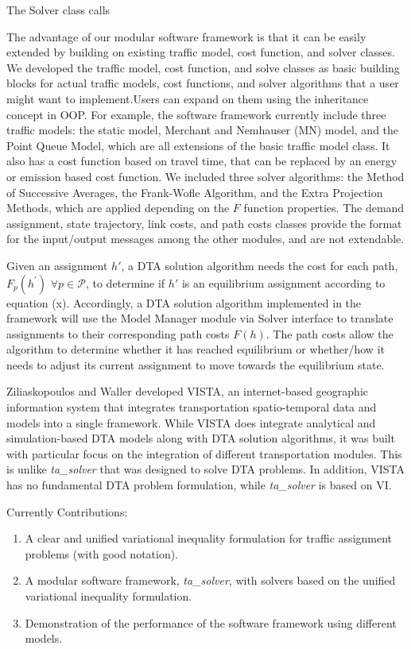 The Solver class calls 

The advantage of our modular software framework is that it can be easily extended by building on existing traffic model, cost function, and solver classes. We developed the traffic model, cost function, and solve classes as basic building blocks for actual traffic models, cost functions, and solver algorithms that a user might want to implement.Users can expand on them using the inheritance concept in OOP. For example, the software framework currently include three traffic models: the static model, Merchant and Nemhauser (MN) model, and the Point Queue Model, which are all extensions of the basic traffic model class. It also has a cost function based on travel time, that can be replaced by an energy or emission based cost function. We included three solver algorithms: the Method of Successive Averages, the Frank-Wofle Algorithm, and the Extra Projection Methods, which are applied depending on the $F$ function properties. The demand assignment, state trajectory, link costs, and path costs classes provide the format for the input/output messages among the other modules, and are not extendable.  

Given an assignment $h'$, a DTA solution algorithm needs the cost for each path, $F_p(h^')$ $\forall p\in\mathcal{P}$, to determine if $h'$ is an equilibrium assignment according to equation (x). Accordingly, a DTA solution algorithm implemented in the framework will use the Model Manager module via Solver interface to translate assignments to their corresponding path costs $F(h)$. The path costs allow the algorithm to determine whether it has reached equilibrium or whether/how it needs to adjust its current assignment to move towards the equilibrium state.

\item Ziliaskopoulos and Waller developed VISTA,
an internet-based geographic information system that integrates transportation spatio-temporal data and models into a single framework. While VISTA does integrate analytical and simulation-based DTA models along with DTA solution algorithms, it was built with particular focus on the integration of different transportation modules. This is unlike \textit{ta\_solver} that was designed to solve DTA problems. In addition, VISTA has no fundamental DTA problem formulation, while \textit{ta\_solver} is based on VI. 

Currently
Contributions:
\begin{enumerate}
\item A clear and unified variational inequality formulation for traffic assignment problems (with good notation).
\item A modular software framework, \textit{ta\_solver},  with solvers based on the unified variational inequality formulation.
\item Demonstration of the performance of the software framework using different models.
\end{enumerate}

